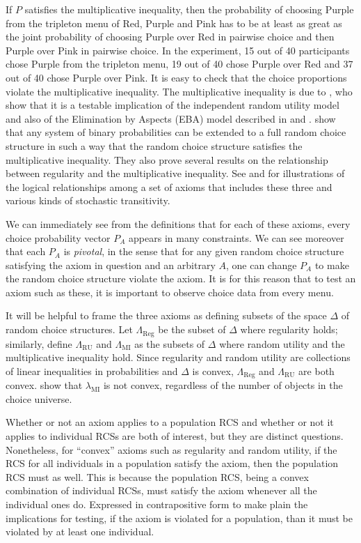 \documentclass[11pt,letter]{article}
\begin{document}
If $P$ satisfies the multiplicative inequality, then the probability of choosing Purple from the tripleton menu of Red, Purple and Pink has to be at least as great as the joint probability of choosing Purple over Red in pairwise choice and then Purple over Pink in pairwise choice.
In the experiment, 15 out of 40 participants chose Purple from the tripleton menu, 19 out of 40 chose Purple over Red and 37 out of 40 chose Purple over Pink.
It is easy to check that the choice proportions violate the multiplicative inequality.
The multiplicative inequality is due to , who show that it is a testable implication of the independent random utility model and also of the Elimination by Aspects (EBA) model described in  and .
 show that any system of binary probabilities can be extended to a full random choice structure in such a way that the random choice structure satisfies the multiplicative inequality.
They also prove several results on the relationship between regularity and the multiplicative inequality.
See  and  for illustrations of the logical relationships among a set of axioms that includes these three and various kinds of stochastic transitivity.

We can immediately see from the definitions that for each of these axioms, every choice probability vector $P_A$ appears in many constraints.
We can see moreover that each $P_A$ is {\em pivotal}, in the sense that for any given random choice structure satisfying the axiom in question and an arbitrary $A$, one can change $P_A$ to make the random choice structure violate the axiom.
It is for this reason that to test an axiom such as these, it is important to observe choice data from every menu.

It will be helpful to frame the three axioms as defining subsets of the space $\Delta$ of random choice structures.
Let $\Lambda_{\mathrm{Reg}}$ be the subset of $\Delta$ where regularity holds; similarly, define $\Lambda_{\mathrm{RU}}$ and $\Lambda_{\mathrm{MI}}$ as the subsets of $\Delta$ where random utility and the multiplicative inequality hold.
Since regularity and random utility are collections of linear inequalities in probabilities and $\Delta$ is convex, $\Lambda_{\mathrm{Reg}}$ and $\Lambda_{\mathrm{RU}}$ are both convex.
 show that $\lambda_{\mathrm{MI}}$ is not convex, regardless of the number of objects in the choice universe.

Whether or not an axiom applies to a population RCS and whether or not it applies to individual RCSs are both of interest, but they are distinct questions.
Nonetheless, for ``convex'' axioms such as regularity and random utility, if the RCS for all individuals in a population satisfy the axiom, then the population RCS must as well.
This is because the population RCS, being a convex combination of individual RCSs, must satisfy the axiom whenever all the individual ones do.
Expressed in contrapositive form to make plain the implications for testing, if the axiom is violated for a population, than it must be violated by at least one individual.
\end{document}

